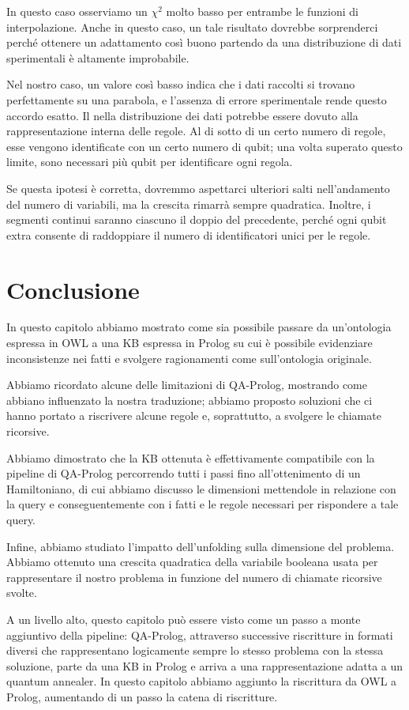 In questo caso osserviamo un $\chi^2$ molto basso per entrambe le funzioni di interpolazione. Anche in questo caso, un tale risultato dovrebbe sorprenderci perché ottenere un adattamento così buono partendo da una distribuzione di dati sperimentali è altamente improbabile. 

Nel nostro caso, un valore così basso indica che i dati raccolti si trovano perfettamente su una parabola, e l'assenza di errore sperimentale rende questo accordo esatto. Il  nella distribuzione dei dati potrebbe essere dovuto alla rappresentazione interna delle regole. Al di sotto di un certo numero di regole, esse vengono identificate con un certo numero di qubit; una volta superato questo limite, sono necessari più qubit per identificare ogni regola. 

Se questa ipotesi è corretta, dovremmo aspettarci ulteriori salti nell'andamento del numero di variabili, ma la crescita rimarrà sempre quadratica. Inoltre, i segmenti continui saranno ciascuno il doppio del precedente, perché ogni qubit extra consente di raddoppiare il numero di identificatori unici per le regole.

\section{Conclusione}
In questo capitolo abbiamo mostrato come sia possibile passare da un'ontologia espressa in OWL a una KB espressa in Prolog su cui è possibile evidenziare inconsistenze nei fatti e svolgere ragionamenti come sull'ontologia originale.

Abbiamo ricordato alcune delle limitazioni di QA-Prolog, mostrando come abbiano influenzato la nostra traduzione; abbiamo proposto soluzioni che ci hanno portato a riscrivere alcune regole e, soprattutto, a svolgere le chiamate ricorsive.

Abbiamo dimostrato che la KB ottenuta è effettivamente compatibile con la pipeline di QA-Prolog percorrendo tutti i passi fino all'ottenimento di un Hamiltoniano, di cui abbiamo discusso le dimensioni mettendole in relazione con la query e conseguentemente con i fatti e le regole necessari per rispondere a tale query.

Infine, abbiamo studiato l'impatto dell'unfolding sulla dimensione del problema. Abbiamo ottenuto una crescita quadratica della variabile booleana usata per rappresentare il nostro problema in funzione del numero di chiamate ricorsive svolte.

A un livello alto, questo capitolo può essere visto come un passo a monte aggiuntivo della pipeline: QA-Prolog, attraverso successive riscritture in formati diversi che rappresentano logicamente sempre lo stesso problema con la stessa soluzione, parte da una KB in Prolog e arriva a una rappresentazione adatta a un quantum annealer. In questo capitolo abbiamo aggiunto la riscrittura da OWL a Prolog, aumentando di un passo la catena di riscritture.